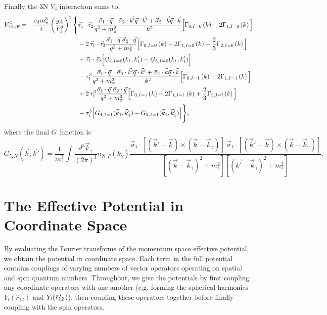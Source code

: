  Finally the 3N $V_4$ interaction sums to,
 \begin{equation}\begin{split}
 \veff^4 = -\frac{c_4 m_\pi^3}{4} \left(\frac{g_A}{F_\pi^2}\right)^2
 \Bigg\{ &\taudot \frac{\vec{\sigma}_1 \cdot \vec{q}}{q^2+m_\pi^2}\frac{\vec{\sigma}_2\cdot\vec{k'}\vec{q}\cdot\vec{k}'+\vec{\sigma}_2\cdot\vec{k}\vec{q}\cdot\vec{k}}{k^2}\Big[\Gam{0}{0}{k}-2\Gam{1}{0}{k}\Big] \\
& - 2\,\taudot\frac{\vec{\sigma}_1 \cdot \vec{q}\;\vec{\sigma}_2 \cdot \vec{q}}{q^2+m_\pi^2}\Big[\Gam{0}{0}{k}-2\Gam{1}{0}{k} +\frac{2}{3}\Gam{2}{0}{k}\Big] \\
& + \taudot\Big[G_{4,I=0}(k_1,k_1')-G_{5,I=0}(k_1,k_1')\Big]\\
%
&-\tau_1^3 \frac{\vec{\sigma}_1 \cdot \vec{q}}{q^2+m_\pi^2}\frac{\vec{\sigma}_2\cdot\vec{k'}\vec{q}\cdot\vec{k}'+\vec{\sigma}_2\cdot\vec{k}\vec{q}\cdot\vec{k}}{k^2}\Big[\Gam{0}{1}{k}-2\Gam{1}{1}{k}\Big] \\
& + 2\,\tau_1^3\frac{\vec{\sigma}_1 \cdot \vec{q}\;\vec{\sigma}_2 \cdot \vec{q}}{q^2+m_\pi^2}\Big[\Gam{0}{1}{k}-2\Gam{1}{1}{k} +\frac{2}{3}\Gam{2}{!}{k}\Big] \\
& - \tau_1^3\Big[G_{4,I=1}(\vec{k}_1,\vec{k}_1')-G_{5,I=1}(\vec{k}_1,\vec{k}_1')\Big]
\Bigg\},
\end{split}
 \end{equation}
 where the final $G$ function is 
 \begin{equation}
 G_{5,N}(\vec{k},\vec{k}')  = \frac{1}{m_\pi^3}\int\frac{d^3\vec{k}_\gamma}{(2\pi)^3} n_{N,P}(k_\gamma) \frac{\vec{\sigma}_1\cdot\left[(\vec{k}'-\vec{k})\times(\vec{k}-\vec{k}_\gamma)\right]\;\vec{\sigma}_1\cdot\left[(\vec{k}'-\vec{k})\times(\vec{k}-\vec{k}_\gamma)\right] }{[(\vec{k}-\vec{k}_\gamma)^2+m_\pi^2][(\vec{k'}-\vec{k}_\gamma)^2+m_\pi^2]}.
 \end{equation}

 
\section{\label{sec:coord}The Effective Potential in Coordinate Space}

By evaluating the Fourier transforms of the momentum space effective potential, we obtain the potential in coordinate space. Each term in the full potential contains couplings of varying numbers of vector operators operating on spatial and spin quantum numbers. Throughout, we give the potentials by first coupling any coordinate operators with one another (e.g. forming the spherical harmonics $Y_l(\hat{r}_{12})$ and $Y_l(\hat{r}_{12}\!\!\!\!'\,\,\,)$), then coupling these operators together before finally coupling with the spin operators.

